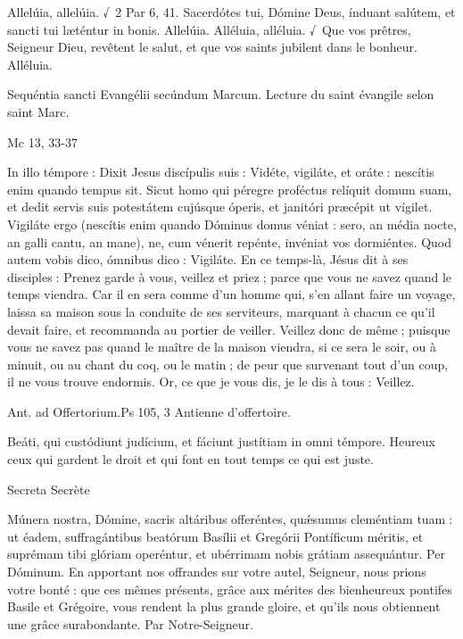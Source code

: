 \begin{paracol}{2}
Allelúia, allelúia. √~2 Par 6, 41. Sacerdótes tui, Dómine Deus, índuant salútem, et sancti tui læténtur in bonis. Allelúia.
\switchcolumn
Alléluia, alléluia. √~Que vos prêtres, Seigneur Dieu, revêtent le salut, et que vos saints jubilent dans le bonheur. Alléluia.
\switchcolumn*

Sequéntia sancti Evangélii secúndum Marcum.
\switchcolumn
Lecture du saint évangile selon saint Marc.
\switchcolumn*

Mc 13, 33-37
\switchcolumn

\switchcolumn*

In illo témpore : Dixit Jesus discípulis suis : Vidéte, vigiláte, et oráte : nescítis enim quando tempus sit. Sicut homo qui péregre proféctus relíquit domum suam, et dedit servis suis potestátem cujúsque óperis, et janitóri præcépit ut vígilet. Vigiláte ergo (nescítis enim quando Dóminus domus véniat : sero, an média nocte, an galli cantu, an mane), ne, cum vénerit repénte, invéniat vos dormiéntes. Quod autem vobis dico, ómnibus dico : Vigiláte.
\switchcolumn
En ce temps-là, Jésus dit à ses disciples : Prenez garde à vous, veillez et priez ; parce que vous ne savez quand le temps viendra. Car il en sera comme d’un homme qui, s’en allant faire un voyage, laissa sa maison sous la conduite de ses serviteurs, marquant à chacun ce qu’il devait faire, et recommanda au portier de veiller. Veillez donc de même ; puisque vous ne savez pas quand le maître de la maison viendra, si ce sera le soir, ou à minuit, ou au chant du coq, ou le matin ; de peur que survenant tout d’un coup, il ne vous trouve endormis. Or, ce que je vous dis, je le dis à tous : Veillez.
\switchcolumn*

Ant. ad Offertorium.\hfill Ps 105, 3
\switchcolumn
Antienne d’offertoire.
\switchcolumn*

Beáti, qui custódiunt judícium, et fáciunt justítiam in omni témpore.
\switchcolumn
Heureux ceux qui gardent le droit et qui font en tout temps ce qui est juste.
\switchcolumn*

Secreta
\switchcolumn
Secrète
\switchcolumn*

Múnera nostra, Dómine, sacris altáribus offeréntes, quǽsumus cleméntiam tuam : ut éadem, suffragántibus beatórum Basílii et Gregórii Pontíficum méritis, et suprémam tibi glóriam operéntur, et ubérrimam nobis grátiam assequántur. Per Dóminum.
\switchcolumn
En apportant nos offrandes sur votre autel, Seigneur, nous prions votre bonté : que ces mêmes présents, grâce aux mérites des bienheureux pontifes Basile et Grégoire, vous rendent la plus grande gloire, et qu’ils nous obtiennent une grâce surabondante. Par Notre-Seigneur.
\switchcolumn*


\end{paracol}
